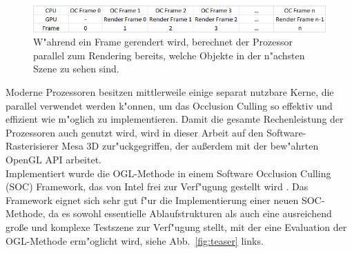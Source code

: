 \documentclass[journal]{vgtc}
\begin{document}
\begin{figure}%
\includegraphics[width=\columnwidth]{images/Ablauf.PNG}%
\caption{W"ahrend ein Frame gerendert wird, berechnet der Prozessor parallel zum Rendering bereits, welche Objekte in der n"achsten Szene zu sehen sind.}%
\label{fig:ablauf}%
\end{figure}

Moderne Prozessoren besitzen mittlerweile einige separat nutzbare Kerne, die parallel verwendet werden k"onnen, um das Occlusion Culling so effektiv und effizient wie m"oglich zu implementieren. Damit die gesamte Rechenleistung der Prozessoren auch genutzt wird, wird in dieser Arbeit auf den Software-Rasterisierer Mesa 3D zur"uckgegriffen, der au{\ss}erdem mit der bew"ahrten OpenGL API arbeitet. \\

Implementiert wurde die OGL-Methode in einem Software Occlusion Culling (SOC) Framework, das von Intel frei zur Verf"ugung gestellt wird \cite{SOCF}. Das Framework eignet sich sehr gut f"ur die Implementierung einer neuen SOC-Methode, da es sowohl essentielle Ablaufstrukturen als auch eine ausreichend gro{\ss}e und komplexe Testszene zur Verf"ugung stellt, mit der eine Evaluation der OGL-Methode erm"oglicht wird, siehe Abb.\ \ref{fig:teaser} links.
\end{document}
